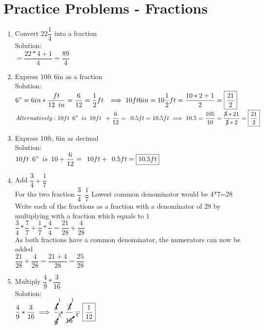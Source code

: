 \section*{Practice Problems - Fractions}
\begin{enumerate}

\item Convert 22$\dfrac{1}{4}$ into a fraction\\
Solution:\\
$=\dfrac{22*4 + 1}{4}=\boxed{\dfrac{89}{4}}$

\item Express 10ft 6in as a fraction\\
Solution:\\
$6" = 6 in * \dfrac{ft}{12 \enspace in} = \dfrac{6}{12}=\dfrac{1}{2}ft \enspace \implies 10ft 6in = 10\dfrac{1}{2}ft=\dfrac{10*2+1}{2}=\boxed{\dfrac{21}{2}}$\\
$Alternatively: 10 ft \enspace 6" \enspace is \enspace 10 ft \enspace +  \dfrac{6}{12}=\enspace 0.5ft= 10.5 ft \implies 10.5=\dfrac{105}{10} = \dfrac{\cancel{5}*21}{\cancel{5}*2}=\boxed{\dfrac{21}{2}}$
\item Express 10ft, 6in as decimal\\
Solution:\\
$10 ft \enspace 6" \enspace is \enspace 10 +  \dfrac{6}{12}=\enspace 10 ft + \enspace 0.5ft = \boxed{10.5 ft}$
\item Add $\dfrac{3}{4}+\dfrac{1}{7}$\\
For the two fraction $\dfrac{3}{4} \enspace \dfrac{1}{7} $
Lowest common denominator would be 4*7=28\\
\vspace{0.2cm}
Write each of the fractions as a fraction with a denominator of 28 by multiplying with a fraction which equals to 1\\
\vspace{0.2cm}
$\dfrac{3}{4}*\dfrac{7}{7}+\dfrac{1}{7}*\dfrac{4}{4}=\dfrac{21}{28}+\dfrac{4}{28}$\\
\vspace{0.2cm}
As both fractions have a common denominator, the numerators can now be added\\
\vspace{0.2cm}
$\dfrac{21}{28}+\dfrac{4}{28}=\dfrac{21+4}{28}=\boxed{\dfrac{25}{28}}$\\
\item Multiply $\dfrac{4}{9}*\dfrac{3}{16}$\\
Solution:\\
$\dfrac{4}{9}*\dfrac{3}{16} \implies \dfrac{\cancelto{1}{4}}{\cancelto{3}{9}}*\dfrac{\cancelto{1}{3}}{\cancelto{4}{16}}=\boxed{\dfrac{1}{12}}$\\
\end{enumerate}

